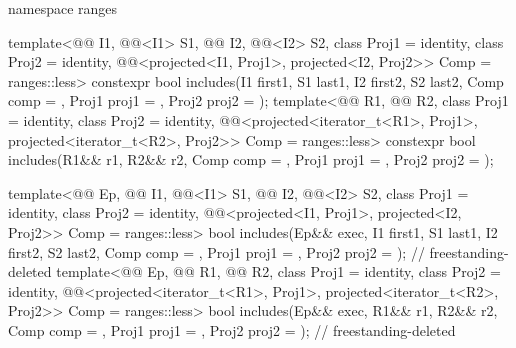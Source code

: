 \begin{codeblock}
{  namespace ranges {
    template<@@ I1, @@<I1> S1, @@ I2, @@<I2> S2,
             class Proj1 = identity, class Proj2 = identity,
             @@<projected<I1, Proj1>, projected<I2, Proj2>> Comp =
               ranges::less>
      constexpr bool includes(I1 first1, S1 last1, I2 first2, S2 last2, Comp comp = {},
                              Proj1 proj1 = {}, Proj2 proj2 = {});
    template<@@ R1, @@ R2, class Proj1 = identity,
             class Proj2 = identity,
             @@<projected<iterator_t<R1>, Proj1>,
                                        projected<iterator_t<R2>, Proj2>> Comp = ranges::less>
      constexpr bool includes(R1&& r1, R2&& r2, Comp comp = {},
                              Proj1 proj1 = {}, Proj2 proj2 = {});

    template<@@ Ep, @@ I1, @@<I1> S1,
             @@ I2, @@<I2> S2,
             class Proj1 = identity, class Proj2 = identity,
             @@<projected<I1, Proj1>, projected<I2, Proj2>> Comp =
               ranges::less>
      bool includes(Ep&& exec, I1 first1, S1 last1, I2 first2, S2 last2,
                    Comp comp = {}, Proj1 proj1 = {}, Proj2 proj2 = {});    // freestanding-deleted
    template<@@ Ep, @@ R1, @@ R2,
             class Proj1 = identity, class Proj2 = identity,
             @@<projected<iterator_t<R1>, Proj1>,
                                        projected<iterator_t<R2>, Proj2>> Comp = ranges::less>
      bool includes(Ep&& exec, R1&& r1, R2&& r2,
                    Comp comp = {}, Proj1 proj1 = {}, Proj2 proj2 = {});    // freestanding-deleted
  }

}
\end{codeblock}
